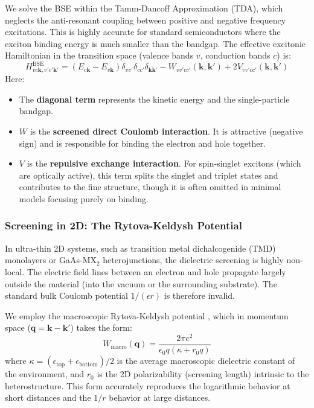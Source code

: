 \documentclass[11pt, a4paper]{article}
\begin{document}
We solve the BSE within the Tamm-Dancoff Approximation (TDA), which neglects the anti-resonant coupling between positive and negative frequency excitations. This is highly accurate for standard semiconductors where the exciton binding energy is much smaller than the bandgap. The effective excitonic Hamiltonian in the transition space (valence bands $v$, conduction bands $c$) is:
\begin{equation}
    H^{\text{BSE}}_{vc\mathbf{k}, v'c'\mathbf{k}'} = \left( E_{c\mathbf{k}} - E_{v\mathbf{k}} \right) \delta_{vv'}\delta_{cc'}\delta_{\mathbf{k}\mathbf{k}'} - W_{vv'cc'}(\mathbf{k}, \mathbf{k}') + 2 V_{vv'cc'}(\mathbf{k}, \mathbf{k}')
\end{equation}
Here:
\begin{itemize}
    \item The \textbf{diagonal term} represents the kinetic energy and the single-particle bandgap.
    \item $W$ is the \textbf{screened direct Coulomb interaction}. It is attractive (negative sign) and is responsible for binding the electron and hole together.
    \item $V$ is the \textbf{repulsive exchange interaction}. For spin-singlet excitons (which are optically active), this term splits the singlet and triplet states and contributes to the fine structure, though it is often omitted in minimal models focusing purely on binding.
\end{itemize}

\subsubsection{Screening in 2D: The Rytova-Keldysh Potential}
In ultra-thin 2D systems, such as transition metal dichalcogenide (TMD) monolayers or GaAs-MX$_2$ heterojunctions, the dielectric screening is highly non-local. The electric field lines between an electron and hole propagate largely outside the material (into the vacuum or the surrounding substrate). The standard bulk Coulomb potential $1/(\epsilon r)$ is therefore invalid.

We employ the macroscopic Rytova-Keldysh potential \cite{rytova1967, keldysh1979}, which in momentum space ($\mathbf{q} = \mathbf{k} - \mathbf{k}'$) takes the form:
\begin{equation}
    W_{\text{macro}}(\mathbf{q}) = \frac{2\pi e^2}{\epsilon_0 q (\kappa + r_0 q)}
\end{equation}
where $\kappa = (\epsilon_{\text{top}} + \epsilon_{\text{bottom}})/2$ is the average macroscopic dielectric constant of the environment, and $r_0$ is the 2D polarizability (screening length) intrinsic to the heterostructure. This form accurately reproduces the logarithmic behavior at short distances and the $1/r$ behavior at large distances.
\end{document}
